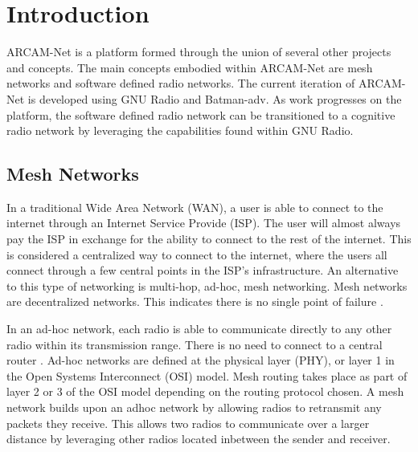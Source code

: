 
\chapter{Introduction} %

\label{Chapter1} %

ARCAM-Net is a platform formed through the union of several other projects and concepts. The main concepts embodied within ARCAM-Net are mesh networks and software defined radio networks. The current iteration of ARCAM-Net is developed using GNU Radio and Batman-adv. As work progresses on the platform, the software defined radio network can be transitioned to a cognitive radio network by leveraging the capabilities found within GNU Radio. 


\newcommand{\keyword}[1]{\textbf{#1}}
\newcommand{\tabhead}[1]{\textbf{#1}}
\newcommand{\code}[1]{\texttt{#1}}
\newcommand{\file}[1]{\texttt{\bfseries#1}}
\newcommand{\option}[1]{\texttt{\itshape#1}}


\section{Mesh Networks}

In a traditional Wide Area Network (WAN), a user is able to connect to the internet through an Internet Service Provide (ISP). The user will almost always pay the ISP in exchange for the ability to connect to the rest of the internet. This is considered a centralized way to connect to the internet, where the users all connect through a few central points in the ISP's infrastructure. An alternative to this type of networking is multi-hop, ad-hoc, mesh networking. Mesh networks are decentralized networks. This indicates there is no single point of failure \cite{4796928}. 

In an ad-hoc network, each radio is able to communicate directly to any other radio within its transmission range. There is no need to connect to a central router \cite{4796928}. Ad-hoc networks are defined at the physical layer (PHY), or layer 1 in the Open Systems Interconnect (OSI) model. Mesh routing takes place as part of layer 2 or 3 of the OSI model depending on the routing protocol chosen. A mesh network builds upon an adhoc network by allowing radios to retransmit any packets they receive. This allows two radios to communicate over a larger distance by leveraging other radios located inbetween the sender and receiver\cite{0033}. 

